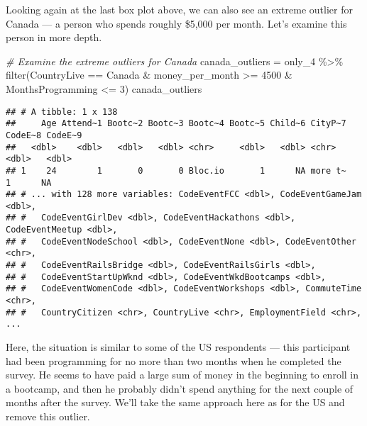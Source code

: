 \documentclass[
]{article}
\newenvironment{Shaded}{\begin{snugshade}}{\end{snugshade}}
\newcommand{\CommentTok}[1]{\textcolor[rgb]{0.56,0.35,0.01}{\textit{#1}}}
\newcommand{\DecValTok}[1]{\textcolor[rgb]{0.00,0.00,0.81}{#1}}
\newcommand{\FunctionTok}[1]{\textcolor[rgb]{0.00,0.00,0.00}{#1}}
\newcommand{\NormalTok}[1]{#1}
\newcommand{\OtherTok}[1]{\textcolor[rgb]{0.56,0.35,0.01}{#1}}
\newcommand{\SpecialCharTok}[1]{\textcolor[rgb]{0.00,0.00,0.00}{#1}}
\newcommand{\StringTok}[1]{\textcolor[rgb]{0.31,0.60,0.02}{#1}}
\begin{document}
Looking again at the last box plot above, we can also see an extreme
outlier for Canada --- a person who spends roughly \$5,000 per month.
Let's examine this person in more depth.

\begin{Shaded}
\begin{Highlighting}[]
\CommentTok{\# Examine the extreme outliers for Canada}
\NormalTok{canada\_outliers }\OtherTok{=}\NormalTok{ only\_4 }\SpecialCharTok{\%\textgreater{}\%}
  \FunctionTok{filter}\NormalTok{(CountryLive }\SpecialCharTok{==} \StringTok{\textquotesingle{}Canada\textquotesingle{}} \SpecialCharTok{\&} 
\NormalTok{           money\_per\_month }\SpecialCharTok{\textgreater{}=} \DecValTok{4500} \SpecialCharTok{\&}
\NormalTok{           MonthsProgramming }\SpecialCharTok{\textless{}=} \DecValTok{3}\NormalTok{)}
\NormalTok{canada\_outliers}
\end{Highlighting}
\end{Shaded}

\begin{verbatim}
## # A tibble: 1 x 138
##     Age Attend~1 Bootc~2 Bootc~3 Bootc~4 Bootc~5 Child~6 CityP~7 CodeE~8 CodeE~9
##   <dbl>    <dbl>   <dbl>   <dbl> <chr>     <dbl>   <dbl> <chr>     <dbl>   <dbl>
## 1    24        1       0       0 Bloc.io       1      NA more t~       1      NA
## # ... with 128 more variables: CodeEventFCC <dbl>, CodeEventGameJam <dbl>,
## #   CodeEventGirlDev <dbl>, CodeEventHackathons <dbl>, CodeEventMeetup <dbl>,
## #   CodeEventNodeSchool <dbl>, CodeEventNone <dbl>, CodeEventOther <chr>,
## #   CodeEventRailsBridge <dbl>, CodeEventRailsGirls <dbl>,
## #   CodeEventStartUpWknd <dbl>, CodeEventWkdBootcamps <dbl>,
## #   CodeEventWomenCode <dbl>, CodeEventWorkshops <dbl>, CommuteTime <chr>,
## #   CountryCitizen <chr>, CountryLive <chr>, EmploymentField <chr>, ...
\end{verbatim}

Here, the situation is similar to some of the US respondents --- this
participant had been programming for no more than two months when he
completed the survey. He seems to have paid a large sum of money in the
beginning to enroll in a bootcamp, and then he probably didn't spend
anything for the next couple of months after the survey. We'll take the
same approach here as for the US and remove this outlier.

\begin{Shaded}
\end{Shaded}
\end{document}
